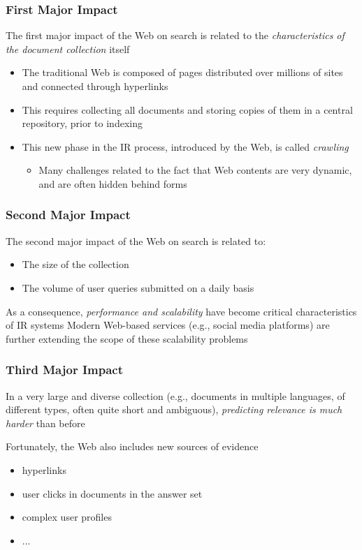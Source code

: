 \documentclass[svgnames]{beamer}
\begin{document}
\begin{frame}
    \frametitle{First Major Impact}

    The first major impact of the Web on search is related to the \emph{characteristics of the document collection} itself

    \begin{itemize}
    \item The traditional Web is composed of pages distributed over millions of sites and connected through hyperlinks
    \item This requires collecting all documents and storing copies of them in a central repository, prior to indexing
    \item This new phase in the IR process, introduced by the Web, is
        called \emph{crawling}
        \begin{itemize}
        \item Many challenges related to the fact that Web contents are very dynamic, and are often hidden behind forms
        \end{itemize}
    \end{itemize}

\end{frame}


\begin{frame}
    \frametitle{Second Major Impact}

    The second major impact of the Web on search is related to: 
    \begin{itemize}
    \item The size of the collection
    \item The volume of user queries submitted on a daily basis
    \end{itemize}

    As a consequence, \emph{performance and scalability} have become critical characteristics of IR systems
    \vfill
    Modern Web-based services (e.g., social media platforms) are further extending the scope of these scalability problems
\end{frame}

\begin{frame}
    \frametitle{Third Major Impact}

    In a very large and diverse collection (e.g., documents in multiple languages, of different types, often quite short and ambiguous), \emph{predicting relevance is much harder} than
    before
    \vfill

    Fortunately, the Web also includes new sources of evidence
    \begin{itemize} 
    \item hyperlinks 
    \item user clicks in documents in the answer set
    \item complex user profiles
    \item ...
    \end{itemize}
\end{frame}
\end{document}
